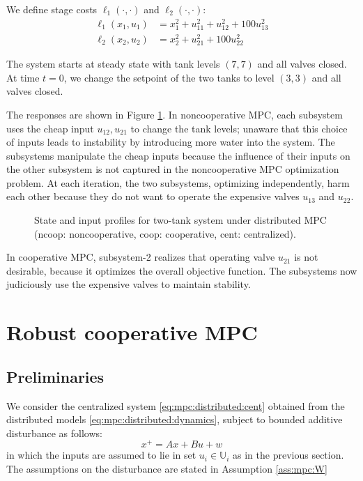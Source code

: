 We define stage costs $\ell_1(\cdot,\cdot)$ and $\ell_2(\cdot,\cdot)$:
\begin{align*}
 \ell_1(x_1,u_1)& = x_1^2+u_{11}^2+ u_{12}^2+
100u_{13}^2 \\
\ell_2(x_2,u_2)& = x_2^2+u_{21}^2+ 100u_{22}^2
\end{align*}
 
 The system starts at 
steady state with tank levels $(7,7)$ and all valves closed. At time $t=0$, we change the setpoint of the
two tanks to level $(3,3)$ and all valves closed.

The responses are shown in Figure \ref{fig:mpc:unstable}.
In noncooperative MPC, each subsystem uses the cheap input
$u_{12},u_{21}$ to change the tank levels; unaware that this choice
of inputs leads to instability by introducing more water into the
system. The subsystems manipulate the cheap inputs because the
influence of their inputs on the other subsystem is not captured in
the noncooperative MPC optimization problem.
At each iteration, the two subsystems, optimizing independently, harm each other because they do
not want to operate the expensive valves $u_{13}$ and $u_{22}$.
\begin{figure}
\centering
\scriptsize
\resizebox{\textwidth}{!}{}
\resizebox{\textwidth}{!}{}
\resizebox{\textwidth}{!}{}
\caption{State and input profiles for two-tank system under
  distributed MPC (ncoop: noncooperative, coop: cooperative, cent: centralized).}
\label{fig:mpc:unstable}
\end{figure}
In cooperative MPC, subsystem-2 realizes that operating valve $u_{21}$
is not desirable, because it optimizes the overall objective function. The subsystems now judiciously use the expensive
valves to maintain stability.



\section{Robust cooperative MPC}
\label{sec:mpc:robust}
\subsection{Preliminaries}
We consider the centralized system \eqref{eq:mpc:distributed:cent}
obtained from the distributed models \eqref{eq:mpc:distributed:dynamics},  subject to bounded additive
disturbance as follows:
\begin{equation}
\label{eq:mpc:model_dist}
x^+ = Ax + Bu + w
\end{equation}
in which the inputs are assumed to lie in set $u_i \in \mathbb{U}_i$
as in the previous section. The assumptions on the disturbance are
stated in Assumption \ref{ass:mpc:W}

